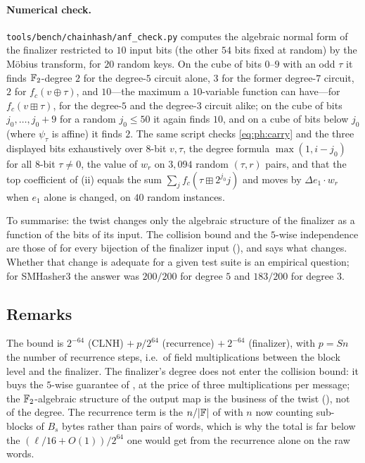 \paragraph{Numerical check.}
\texttt{tools/bench/chainhash/anf\_check.py}
computes the algebraic normal form of the finalizer restricted to $10$ input
bits (the other $54$ bits fixed at random) by the M\"obius transform, for
$20$ random keys.  On the cube of bits $0$--$9$ with an odd $\tau$ it finds
$\mathbb{F}_2$-degree $2$ for the degree-$5$ circuit alone, $3$ for the former
degree-$7$ circuit, $2$ for $f_c(v\oplus \tau)$, and $10$---the maximum a
$10$-variable function can have---for $f_c(v\boxplus \tau)$, for the degree-$5$
and the degree-$3$ circuit alike; on the cube of bits $j_0,\dots,j_0+9$ for
a random $j_0\le50$ it again finds $10$, and on a cube of bits below $j_0$
(where $\psi_\tau$ is affine) it finds $2$.  The same script checks
\eqref{eq:ph:carry} and the three displayed bits exhaustively over $8$-bit
$v,\tau$, the degree formula $\max(1,i-j_0)$ for all $8$-bit $\tau\ne0$, the value
of $w_r$ on $3{,}094$ random $(\tau,r)$ pairs, and that the top coefficient of
(ii) equals the sum $\sum_jf_c(\tau\boxplus2^{j_0}j)$ and
moves by $\Delta e_1\cdot w_r$ when $e_1$ alone is changed, on $40$ random
instances.

To summarise: the twist changes only the algebraic structure of the
finalizer as a function of the bits of its input.  The collision bound and
the $5$-wise independence are those of 
for every bijection of the finalizer input (), and
 says what changes.  Whether that change is
adequate for a given test suite is an empirical question; for SMHasher3 the
answer was $200/200$ for degree $5$ and $183/200$ for degree $3$.

\subsection{Remarks}

\begin{remark}
The bound is $2^{-64}$ (CLNH) $+\ p/2^{64}$ (recurrence) $+\ 2^{-64}$
(finalizer), with $p=Sn$ the number of recurrence steps, i.e.\ of field
multiplications between the block level and the finalizer.  The finalizer's
degree does not enter the collision bound: it buys the $5$-wise guarantee of
, at the price of three multiplications per message; the
$\mathbb{F}_2$-algebraic structure of the output map is the business of the twist
(), not of the degree.  The recurrence term is the $n/|\mathbb{F}|$ of  with
$n$ now counting sub-blocks of $B_s$ bytes rather than pairs of words, which
is why the total is far below the $(\ell/16+O(1))/2^{64}$ one would get from
the recurrence alone on the raw words.
\end{remark}

